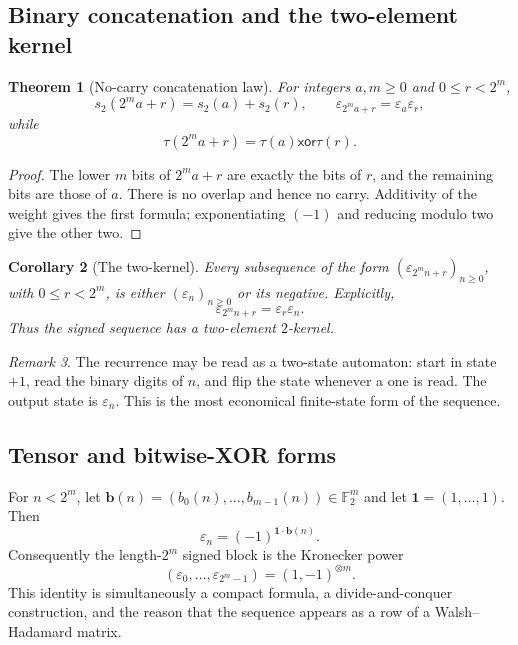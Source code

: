 \documentclass[11pt,oneside]{article}
\newtheorem{theorem}{Theorem}[section]
\newtheorem{corollary}[theorem]{Corollary}
\theoremstyle{definition}
\theoremstyle{remark}
\newtheorem{remark}[theorem]{Remark}
\newcommand{\F}{\mathbb F}
\newcommand{\swt}{s_2}
\newcommand{\eps}{\varepsilon}
\newcommand{\xor}{\mathbin{\mathsf{xor}}}
\newcommand{\1}{\mathbf 1}
\begin{document}
\subsection{Binary concatenation and the two-element kernel}

\begin{theorem}[No-carry concatenation law]
\label{thm:concat}
For integers \(a,m\ge0\) and \(0\le r<2^m\),
\begin{equation}
 \swt(2^ma+r)=\swt(a)+\swt(r),
 \qquad
 \eps_{2^ma+r}=\eps_a\eps_r,
 \label{eq:concat-sign}
\end{equation}
while
\begin{equation}
 \tau(2^ma+r)=\tau(a)\xor\tau(r).
 \label{eq:concat-bit}
\end{equation}
\end{theorem}

\begin{proof}
The lower \(m\) bits of \(2^ma+r\) are exactly the bits of \(r\), and the remaining bits are
those of \(a\).  There is no overlap and hence no carry.  Additivity of the weight gives the
first formula; exponentiating \((-1)\) and reducing modulo two give the other two.
\end{proof}

\begin{corollary}[The two-kernel]
\label{cor:2kernel}
Every subsequence of the form \((\eps_{2^mn+r})_{n\ge0}\), with \(0\le r<2^m\), is either
\((\eps_n)_{n\ge0}\) or its negative.  Explicitly,
\begin{equation}
 \eps_{2^mn+r}=\eps_r\eps_n.
 \label{eq:kernel}
\end{equation}
Thus the signed sequence has a two-element \(2\)-kernel.
\end{corollary}

\begin{remark}
The recurrence may be read as a two-state automaton: start in state \(+1\), read the binary
digits of \(n\), and flip the state whenever a one is read.  The output state is \(\eps_n\).
This is the most economical finite-state form of the sequence.
\end{remark}

\subsection{Tensor and bitwise-XOR forms}

For \(n<2^m\), let \(\bm b(n)=(b_0(n),\ldots,b_{m-1}(n))\in\F_2^m\) and let
\(\bm1=(1,\ldots,1)\).  Then
\begin{equation}
 \eps_n=(-1)^{\bm1\cdot\bm b(n)}.
 \label{eq:parity-character}
\end{equation}
Consequently the length-\(2^m\) signed block is the Kronecker power
\begin{equation}
 (\eps_0,\ldots,\eps_{2^m-1})=(1,-1)^{\otimes m}.
 \label{eq:tensor}
\end{equation}
This identity is simultaneously a compact formula, a divide-and-conquer construction, and the
reason that the sequence appears as a row of a Walsh--Hadamard matrix.
\end{document}

